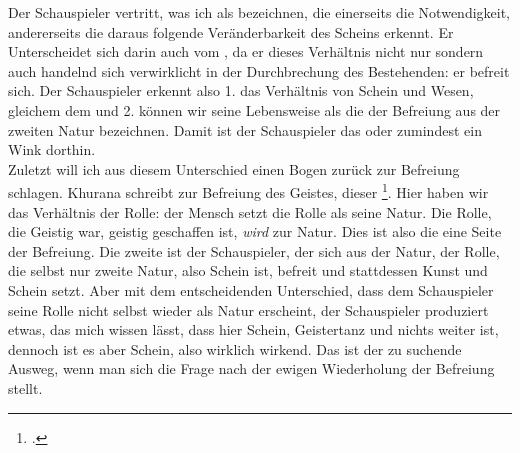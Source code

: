 \documentclass[12pt, a4paper, openany]{report}
\begin{document}
Der Schauspieler vertritt, was ich als  bezeichnen, die einerseits die Notwendigkeit, andererseits die daraus folgende Veränderbarkeit des Scheins erkennt.
Er Unterscheidet sich darin auch vom , da er dieses Verhältnis nicht nur  sondern auch handelnd sich verwirklicht in der Durchbrechung des Bestehenden: 
er befreit sich.
Der Schauspieler erkennt also 1. das Verhältnis von Schein und Wesen, gleichem dem  und 2. können wir seine Lebensweise als die der Befreiung aus der zweiten Natur bezeichnen. 
Damit ist der Schauspieler das  oder zumindest ein Wink dorthin.
\\

Zuletzt will ich aus diesem Unterschied einen Bogen zurück zur Befreiung schlagen.
Khurana schreibt zur Befreiung des Geistes, dieser \footcite[][393]{khurana_freiheit_2017}. 
Hier haben wir das Verhältnis der Rolle: der Mensch setzt die Rolle als seine Natur. 
Die Rolle, die Geistig war, geistig geschaffen ist, \emph{wird} zur Natur. 
Dies ist also die eine Seite der Befreiung. 
Die zweite ist der Schauspieler, der sich aus der Natur, der Rolle, die selbst nur zweite Natur, also Schein ist, befreit und stattdessen Kunst und Schein setzt. 
Aber mit dem entscheidenden Unterschied, dass dem Schauspieler seine Rolle nicht selbst wieder als Natur erscheint, der Schauspieler produziert etwas, das mich wissen lässt, dass hier Schein, Geistertanz und nichts weiter ist, dennoch ist es aber Schein, also wirklich wirkend.
Das ist der zu suchende Ausweg, wenn man sich die Frage nach der ewigen Wiederholung der Befreiung stellt.
\end{document}
